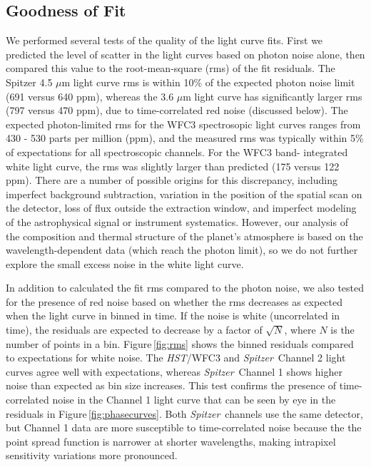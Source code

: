 \documentclass[twocolumn]{aastex61}
\newcommand{\project}[1]{\textsl{#1}}
\newcommand{\HST}{\project{HST}}
\newcommand{\Spitzer}{\project{Spitzer}}
\begin{document}
\subsection{Goodness of Fit}
We performed several tests of the quality of the light curve fits.  First we predicted the level of scatter in the light curves based on photon noise alone, then compared this value to the root-mean-square (rms) of the fit residuals.  The Spitzer 4.5 $\mu$m light curve rms is within 10\% of the expected photon noise limit (691 versus 640 ppm), whereas the 3.6 $\mu$m light curve has significantly larger rms (797 versus 470 ppm), due to time-correlated red noise (discussed below). The expected photon-limited rms for the WFC3 spectrosopic light curves ranges from 430 - 530 parts per million (ppm), and the measured rms was typically within 5\% of expectations for all spectroscopic channels.  For the WFC3 band- integrated white light curve, the rms was slightly larger than predicted (175 versus 122 ppm). There are a number of possible origins for this discrepancy, including imperfect background subtraction, variation in the position of the spatial scan on the detector, loss of flux outside the extraction window, and imperfect modeling of the astrophysical signal or instrument systematics. However, our analysis of the composition and thermal structure of the planet's atmosphere is based on the wavelength-dependent data (which reach the photon limit), so we do not further explore the small excess noise in the white light curve. 




In addition to calculated the fit rms compared to the photon noise, we also tested for the presence of red noise based on whether the rms decreases as expected when the light curve in binned in time.  If the noise is white (uncorrelated in time), the residuals are expected to decrease by a factor of $\sqrt{N}$, where $N$ is the number of points in a bin. Figure\,\ref{fig:rms} shows the binned residuals compared to expectations for white noise. The \HST/WFC3 and \Spitzer\ Channel 2 light curves agree well with expectations, whereas \Spitzer\ Channel 1 shows higher noise than expected as bin size increases. This test confirms the presence of time-correlated noise in the Channel 1 light curve that can be seen by eye in the residuals in Figure\,\ref{fig:phasecurves}. Both \Spitzer\ channels use the same detector, but Channel 1 data are more susceptible to time-correlated noise because the the point spread function is narrower at shorter wavelengths, making intrapixel sensitivity variations more pronounced.
\end{document}
